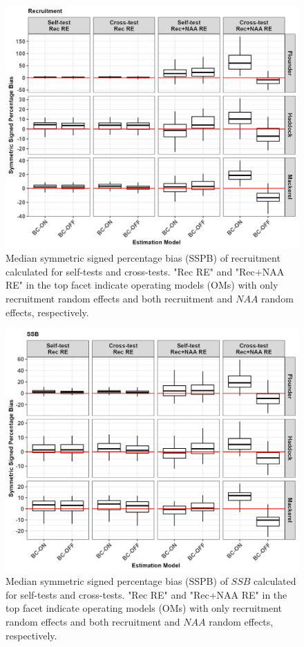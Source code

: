 \documentclass[
  12pt,
]{article}
\begin{document}
\begin{figure}[H]
    \centering
    \includegraphics[width=\textwidth]{Original_Figures&Tables/Median_Rec_SSPB.PNG}
    \caption{Median symmetric signed percentage bias (SSPB) of recruitment calculated for self-tests and cross-tests. "Rec RE" and "Rec+NAA RE" in the top facet indicate operating models (OMs) with only recruitment random effects and both recruitment and $NAA$ random effects, respectively.}
    \label{fig:supp_Rec_SSPB}
\end{figure}

\begin{figure}[H]
    \centering
    \includegraphics[width=\textwidth]{Original_Figures&Tables/Median_SSB_SSPB.PNG}
    \caption{Median symmetric signed percentage bias (SSPB) of $SSB$ calculated for self-tests and cross-tests. "Rec RE" and "Rec+NAA RE" in the top facet indicate operating models (OMs) with only recruitment random effects and both recruitment and $NAA$ random effects, respectively.}
    \label{fig:supp_SSB_SSPB}
\end{figure}
\end{document}
